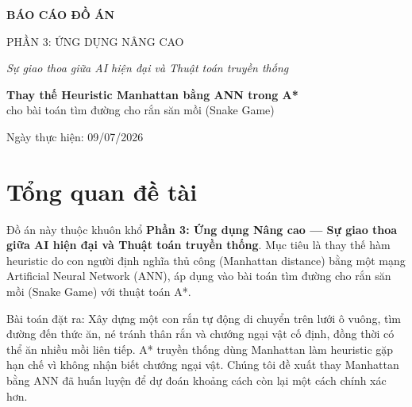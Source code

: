 \documentclass[12pt,a4paper]{article}
\begin{document}
\begin{titlepage}
    \begin{center}
        \vspace*{3cm}

        {\Huge \bfseries BÁO CÁO ĐỒ ÁN}

        \vspace{0.5cm}

        {\LARGE PHẦN 3: ỨNG DỤNG NÂNG CAO}

        \vspace{0.3cm}

        {\large\itshape Sự giao thoa giữa AI hiện đại và Thuật toán truyền thống}

        \vspace{1cm}

        {\Large \textbf{Thay thế Heuristic Manhattan bằng ANN trong A*}\\ 
         cho bài toán tìm đường cho rắn săn mồi (Snake Game)}

        \vfill

        {\large Ngày thực hiện: 09/07/2026}
    \end{center}
\end{titlepage}

\newpage
\tableofcontents
\newpage

\section{Tổng quan đề tài}

Đồ án này thuộc khuôn khổ \textbf{Phần 3: Ứng dụng Nâng cao --- Sự giao thoa giữa AI hiện đại và Thuật toán truyền thống}. 
Mục tiêu là thay thế hàm heuristic do con người định nghĩa thủ công (Manhattan distance) bằng một mạng Artificial Neural Network (ANN), 
áp dụng vào bài toán tìm đường cho rắn săn mồi (Snake Game) với thuật toán A*.

Bài toán đặt ra: Xây dựng một con rắn tự động di chuyển trên lưới ô vuông, tìm đường đến thức ăn, 
né tránh thân rắn và chướng ngại vật cố định, đồng thời có thể ăn nhiều mồi liên tiếp. 
A* truyền thống dùng Manhattan làm heuristic gặp hạn chế vì không nhận biết chướng ngại vật. 
Chúng tôi đề xuất thay Manhattan bằng ANN đã huấn luyện để dự đoán khoảng cách còn lại một cách chính xác hơn.
\end{document}
